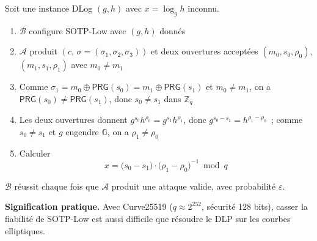 \begin{sloppypar}
\begin{Preuve}
Soit une instance DLog $(g,h)$ avec $x = \log_g h$ inconnu.
\begin{enumerate}
\item $\mathcal{B}$ configure SOTP-Low avec $(g,h)$ donn\'es
\item $\mathcal{A}$ produit $(c,\,\sigma{=}(\sigma_1,\sigma_2,\sigma_3))$ et deux
      ouvertures accept\'ees $(m_0, s_0, \rho_0)$, $(m_1, s_1, \rho_1)$ avec
      $m_0 \neq m_1$
\item Comme $\sigma_1 = m_0 \oplus \mathsf{PRG}(s_0) = m_1 \oplus \mathsf{PRG}(s_1)$ et
      $m_0 \neq m_1$, on a $\mathsf{PRG}(s_0) \neq \mathsf{PRG}(s_1)$, donc
      $s_0 \neq s_1$ dans $\mathbb{Z}_q$
\item Les deux ouvertures donnent $g^{s_0}h^{\rho_0} = g^{s_1}h^{\rho_1}$, donc
      $g^{s_0-s_1} = h^{\rho_1-\rho_0}$~; comme $s_0 \neq s_1$ et $g$ engendre
      $\mathbb{G}$, on a $\rho_1 \neq \rho_0$
\item Calculer
\begin{equation}
x = \bigl(s_0-s_1\bigr)\cdot\bigl(\rho_1-\rho_0\bigr)^{-1} \bmod q
\end{equation}
\end{enumerate}
$\mathcal{B}$ r\'eussit chaque fois que $\mathcal{A}$ produit une
attaque valide, avec probabilit\'e $\varepsilon$.
\end{Preuve}

\noindent\textbf{Signification pratique.} Avec Curve25519 ($q \approx 2^{252}$,
s\'ecurit\'e 128 bits), casser la fiabilit\'e de SOTP-Low est aussi difficile
que r\'esoudre le DLP sur les courbes elliptiques.
\end{sloppypar}


